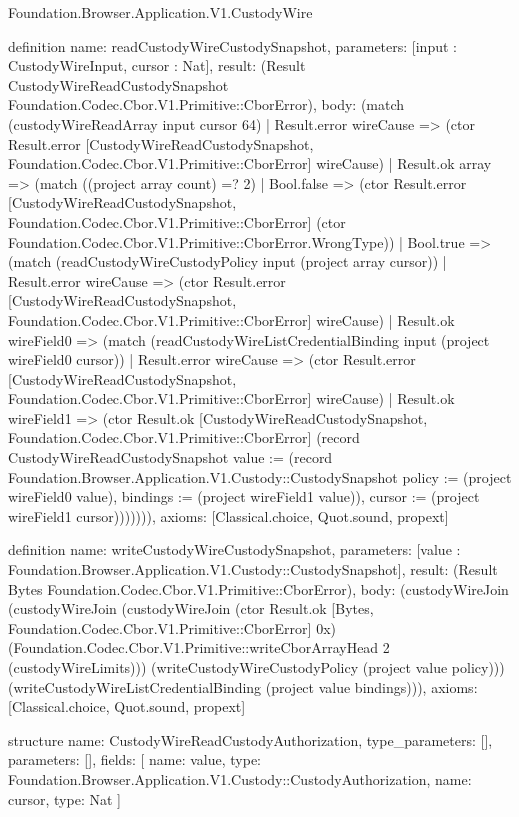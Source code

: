 \begin{lexlean}{Foundation.Browser.Application.V1.CustodyWire}
\begin{semanticmodule}
definition{
  name: readCustodyWireCustodySnapshot,
  parameters: [input : CustodyWireInput, cursor : Nat],
  result: (Result CustodyWireReadCustodySnapshot Foundation.Codec.Cbor.V1.Primitive::CborError),
  body: (match (custodyWireReadArray input cursor 64)
    | Result.error wireCause => (ctor Result.error [CustodyWireReadCustodySnapshot, Foundation.Codec.Cbor.V1.Primitive::CborError] wireCause)
    | Result.ok array => (match ((project array count) =? 2)
      | Bool.false => (ctor Result.error [CustodyWireReadCustodySnapshot, Foundation.Codec.Cbor.V1.Primitive::CborError] (ctor Foundation.Codec.Cbor.V1.Primitive::CborError.WrongType))
      | Bool.true => (match (readCustodyWireCustodyPolicy input (project array cursor))
        | Result.error wireCause => (ctor Result.error [CustodyWireReadCustodySnapshot, Foundation.Codec.Cbor.V1.Primitive::CborError] wireCause)
        | Result.ok wireField0 => (match (readCustodyWireListCredentialBinding input (project wireField0 cursor))
          | Result.error wireCause => (ctor Result.error [CustodyWireReadCustodySnapshot, Foundation.Codec.Cbor.V1.Primitive::CborError] wireCause)
          | Result.ok wireField1 => (ctor Result.ok [CustodyWireReadCustodySnapshot, Foundation.Codec.Cbor.V1.Primitive::CborError] (record CustodyWireReadCustodySnapshot {value := (record Foundation.Browser.Application.V1.Custody::CustodySnapshot {policy := (project wireField0 value), bindings := (project wireField1 value)}), cursor := (project wireField1 cursor)})))))),
  axioms: [Classical.choice, Quot.sound, propext]
}

definition{
  name: writeCustodyWireCustodySnapshot,
  parameters: [value : Foundation.Browser.Application.V1.Custody::CustodySnapshot],
  result: (Result Bytes Foundation.Codec.Cbor.V1.Primitive::CborError),
  body: (custodyWireJoin (custodyWireJoin (custodyWireJoin (ctor Result.ok [Bytes, Foundation.Codec.Cbor.V1.Primitive::CborError] 0x) (Foundation.Codec.Cbor.V1.Primitive::writeCborArrayHead 2 (custodyWireLimits))) (writeCustodyWireCustodyPolicy (project value policy))) (writeCustodyWireListCredentialBinding (project value bindings))),
  axioms: [Classical.choice, Quot.sound, propext]
}

structure{
  name: CustodyWireReadCustodyAuthorization,
  type_parameters: [],
  parameters: [],
  fields: [
    {name: value, type: Foundation.Browser.Application.V1.Custody::CustodyAuthorization},
    {name: cursor, type: Nat}
  ]
}


\end{semanticmodule}
\end{lexlean}

